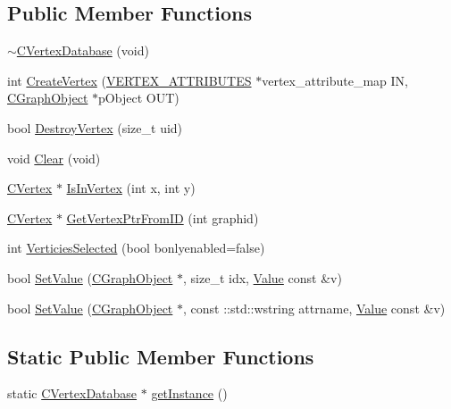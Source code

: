 \subsection*{Public Member Functions}
\begin{DoxyCompactItemize}
\item 
\hyperlink{class_c_vertex_database_a80aed877dcbb3f2b2eb54d3ccbf9970e}{$\sim$\+C\+Vertex\+Database} (void)
\item 
int \hyperlink{class_c_vertex_database_a6661e33ae231541d6643cf46f73fe7f5}{Create\+Vertex} (\hyperlink{_object_database_defines_8h_a04cdff03435daf95f7394f44122bb5fa}{V\+E\+R\+T\+E\+X\+\_\+\+A\+T\+T\+R\+I\+B\+U\+T\+E\+S} $\ast$vertex\+\_\+attribute\+\_\+map I\+N, \hyperlink{class_c_graph_object}{C\+Graph\+Object} $\ast$p\+Object O\+U\+T)
\item 
bool \hyperlink{class_c_vertex_database_a8710e656bddbd5708e640abedd5e2603}{Destroy\+Vertex} (size\+\_\+t uid)
\item 
void \hyperlink{class_c_vertex_database_a4f2563f4eff59267d3381d332a205fe5}{Clear} (void)
\item 
\hyperlink{class_c_vertex}{C\+Vertex} $\ast$ \hyperlink{class_c_vertex_database_af617e589aeb8672c4f3d88854b95638d}{Is\+In\+Vertex} (int x, int y)
\item 
\hyperlink{class_c_vertex}{C\+Vertex} $\ast$ \hyperlink{class_c_vertex_database_aec146ef412a252f67db09677d988549b}{Get\+Vertex\+Ptr\+From\+I\+D} (int graphid)
\item 
int \hyperlink{class_c_vertex_database_a16874bebb91c4f12a1ba25609d0a69bc}{Verticies\+Selected} (bool bonlyenabled=false)
\item 
bool \hyperlink{class_c_vertex_database_a04b9bbb3f0e429b28058fc72bd394f42}{Set\+Value} (\hyperlink{class_c_graph_object}{C\+Graph\+Object} $\ast$, size\+\_\+t idx, \hyperlink{class_value}{Value} const \&v)
\item 
bool \hyperlink{class_c_vertex_database_ad78aba2fdfdf3de79ba0be14a4847bfa}{Set\+Value} (\hyperlink{class_c_graph_object}{C\+Graph\+Object} $\ast$, const \+::std\+::wstring attrname, \hyperlink{class_value}{Value} const \&v)
\end{DoxyCompactItemize}
\subsection*{Static Public Member Functions}
\begin{DoxyCompactItemize}
\item 
static \hyperlink{class_c_vertex_database}{C\+Vertex\+Database} $\ast$ \hyperlink{class_c_vertex_database_ad6b9833e64dd90e4315d87502d5cf544}{get\+Instance} ()
\end{DoxyCompactItemize}
